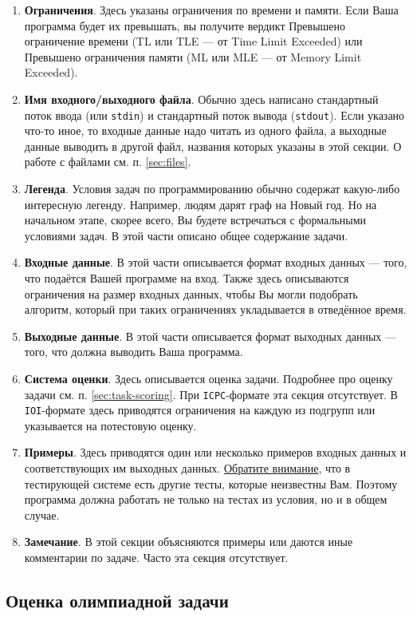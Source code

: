 \documentclass{article}
\begin{document}
	\begin{enumerate}
		\item{\textbf{Ограничения}. Здесь указаны ограничения по времени и памяти. Если Ваша программа будет их превышать, вы получите вердикт Превышено ограничение времени (TL или TLE --- от Time Limit Exceeded) или Превышено ограничения памяти (ML или MLE --- от Memory Limit Exceeded).}
		\item{\textbf{Имя входного/выходного файла}. Обычно здесь написано стандартный поток ввода (или \texttt{stdin}) и стандартный поток вывода (\texttt{stdout}). Если указано что-то иное, то входные данные надо читать из одного файла, а выходные данные выводить в другой файл, названия которых указаны в этой секции. О работе с файлами см. п. \ref*{sec:files}.}
		\item{\textbf{Легенда}. Условия задач по программированию обычно содержат какую-либо интересную легенду. Например, людям дарят граф на Новый год. Но на начальном этапе, скорее всего, Вы будете встречаться с формальными условиями задач. В этой части описано общее содержание задачи.}
		\item{\textbf{Входные данные}. В этой части описывается формат входных данных --- того, что подаётся Вашей программе на вход. Также здесь описываются ограничения на размер входных данных, чтобы Вы могли подобрать алгоритм, который при таких ограничениях укладывается в отведённое время.}
		\item{\textbf{Выходные данные}. В этой части описывается формат выходных данных --- того, что должна выводить Ваша программа.}
		\item{\textbf{Система оценки}. Здесь описывается оценка задачи. Подробнее про оценку задачи см. п. \ref*{sec:task-scoring}. При \texttt{ICPC}-формате эта секция отсутствует. В \texttt{IOI}-формате здесь приводятся ограничения на каждую из подгрупп или указывается на потестовую оценку.}
		\item{\textbf{Примеры}. Здесь приводятся один или несколько примеров входных данных и соответствующих им выходных данных. \underline{Обратите внимание}, что в тестирующей системе есть другие тесты, которые неизвестны Вам. Поэтому программа должна работать не только на тестах из условия, но и в общем случае.}
		\item{\textbf{Замечание}. В этой секции объясняются примеры или даются иные комментарии по задаче. Часто эта секция отсутствует.}
	\end{enumerate}
	
	\subsection{Оценка олимпиадной задачи}
	
\end{document}
